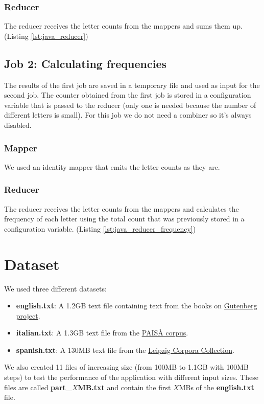 \documentclass{article}
\begin{document}
\begin{multicols}{2}
        \subsubsection{Reducer}
            The reducer receives the letter counts from the mappers and sums them up.
            (Listing \ref{lst:java_reducer})
    \subsection{Job 2: Calculating frequencies}
        The results of the first job are saved in a temporary file and used as input for the second job.
        The counter obtained from the first job is stored in a configuration variable that is passed to the 
        reducer (only one is needed because the number of different letters is small).
        For this job we do not need a combiner so it's always disabled.
        \subsubsection{Mapper}
            We used an identity mapper that emits the letter counts as they are.
        \subsubsection{Reducer}
            The reducer receives the letter counts from the mappers and calculates the frequency of each letter
            using the total count that was previously stored in a configuration variable.
            (Listing \ref{lst:java_reducer_frequency})
\section{Dataset}
    We used three different datasets:
    \begin{itemize}
        \item \textbf{english.txt}: A 1.2GB text file containing text from the books on \href{https://www.gutenberg.org/}{Gutenberg project}.
        \item \textbf{italian.txt}: A 1.3GB text file from the \href{https://www.corpusitaliano.it/}{PAISÀ corpus}\cite{lyding-etal-2014-paisa}.
        \item \textbf{spanish.txt}: A 130MB text file from the \href{https://wortschatz.uni-leipzig.de/en/download/Spanish}{Leipzig Corpora Collection}\cite{Eckart2013}.
    \end{itemize}
    We also created 11 files of increasing size (from 100MB to 1.1GB with 100MB steps) to test the performance
    of the application with different input sizes. These files are called \textbf{part\_$X$MB.txt} and 
    contain the first $X$MBs of the \textbf{english.txt} file. 

\end{multicols}
\end{document}
